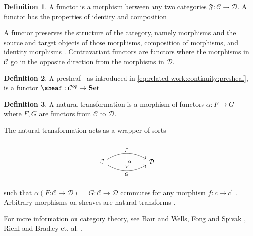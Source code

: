 \documentclass[10pt,journal,compsoc]{IEEEtran}
\theoremstyle{definition}
\newtheorem{definition}{Definition}[section]
\theoremstyle{remark}
\begin{document}
 \begin{definition} A functor is a morphism between any two  categories $\mathfrak{F}: \mathcal{C} \rightarrow \mathcal{D}$. A functor has the properties of identity and composition \cite{riehlCategoryTheoryContext}\end{definition}
A functor preserves the structure of the category, namely morphisms and the source and target objects of those morphisms, composition of morphisms, and identity morphisms \cite{riehlCategoryTheoryContext}. Contravariant functors are functors where the morphisms in $\mathcal{C}$ go in the opposite direction from the morphisms in $\mathcal{D}$.  

 \begin{definition} A presheaf \sheafc\, as introduced in \autoref{eq:related-work:continuity:presheaf}, is a functor $\sheaf: \mathcal{C}^{op} \rightarrow \textbf{Set}$.\cite{nlab:presheaf} \end{definition}

 \begin{definition} A natural transformation is a morphism of functors $\alpha: F \rightarrow G$ where $F, G$ are functors from $\mathcal{C}$ to $\mathcal{D}$. \cite{riehlCategoryTheoryContext, bradleyWhatNaturalTransformation}
 \end{definition}
The natural transformation acts as a wrapper of sorts
\begin{equation}
  \label{eq:related-work:equivariance:natural-transform}
\begin{tikzcd}
  & {} \arrow[dd, "\alpha", Rightarrow, shorten=1.5em] &             \\
\mathcal{C} \arrow[rr, "F", bend left] \arrow[rr, "G"', bend right] &                                     & \mathcal{D} \\
  & {}                                  &            
\end{tikzcd}
\end{equation}
such that $\alpha(F: \mathcal{C} \rightarrow \mathcal{D}) = G: \mathcal{C} \rightarrow \mathcal{D}$ commutes for any morphism $f:c\rightarrow c^{\prime}$ \cite{fongInvitationAppliedCategory2019}. Arbitrary morphisms on sheaves are natural transforms \cite{SheafMathematics2021,bradleyWhatNaturalTransformation}. 

For more information on category theory, see Barr and Wells\cite{barrCategoryTheoryComputing}, Fong and Spivak \cite{fongInvitationAppliedCategory2019}, Riehl\cite{riehlCategoryTheoryContext} and Bradley et. al. \cite{bradleyTopologyCategoricalApproach2020}.
\end{document}
